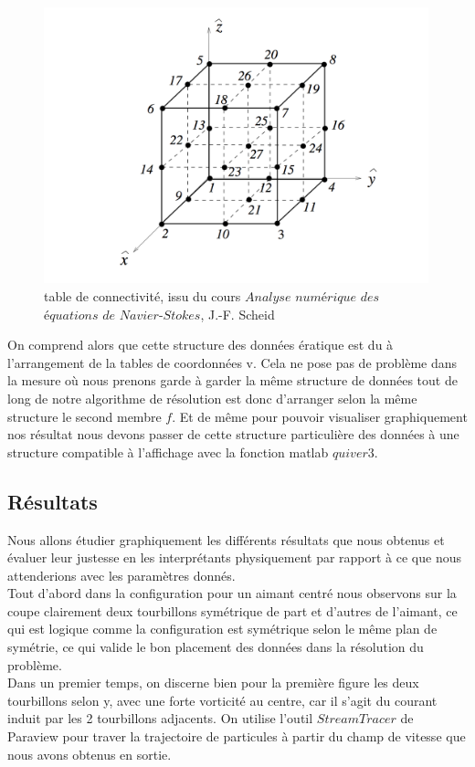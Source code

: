 \documentclass[a4paper,12pt,titlepage]{report}
\begin{document}
\begin{onehalfspace}
\begin{figure}[h]
\center
\includegraphics[height = 8cm, keepaspectratio]{graphes/table_de_connectivite.png} 
\caption{\label{figure 38 } table de connectivité, issu du cours $Analyse$ $numérique$ $des$ $équations$ $de$ $Navier$-$Stokes$, J.-F. Scheid}
\end{figure}
On comprend alors que cette structure des données ératique est du à l'arrangement de la tables de coordonnées v. Cela ne pose pas de problème dans la mesure où nous prenons garde à garder la même structure de données tout de long de notre algorithme de résolution est donc d'arranger selon la même structure le second membre $f$.
Et de même pour pouvoir visualiser graphiquement nos résultat nous devons passer de cette structure particulière des données à une structure compatible à l'affichage avec la fonction matlab $quiver3$.
 
\newpage
\subsection{Résultats}
Nous allons étudier graphiquement les différents résultats que nous obtenus et évaluer leur justesse en les interprétants physiquement par rapport à ce que nous attenderions avec les paramètres donnés.
\newline
\\
Tout d'abord dans la configuration pour un aimant centré nous observons sur la coupe clairement deux tourbillons symétrique de part et d'autres de l'aimant, ce qui est logique comme la configuration est symétrique selon le même plan de symétrie, ce qui valide le bon placement des données dans la résolution du problème.
\\
Dans un premier temps, on discerne bien pour la première figure les deux tourbillons selon y, avec une forte vorticité au centre, car il s'agit du courant induit par les 2 tourbillons adjacents.
On utilise l'outil $StreamTracer$ de Paraview pour traver la trajectoire de particules à partir du champ de vitesse que nous avons obtenus en sortie.


\end{onehalfspace}
\end{document}
